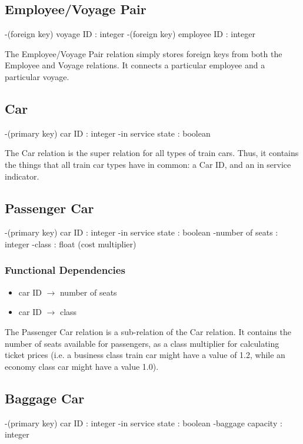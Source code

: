\documentclass[a4paper]{article}
\begin{document}
\subsection*{Employee/Voyage Pair}
\begin{itemize}
-(foreign key) voyage ID : integer
-(foreign key) employee ID : integer
\end{itemize}
The Employee/Voyage Pair relation simply stores foreign keys from both the Employee and Voyage relations. It connects a particular employee and a particular voyage.

\subsection*{Car}
\begin{itemize}
-(primary key) car ID : integer
-in service state : boolean
\end{itemize}
The Car relation is the super relation for all types of train cars. Thus, it contains the things that all train car types have in common: a Car ID, and an in service indicator.

\subsection*{Passenger Car}
\begin{itemize}
-(primary key) car ID : integer
-in service state : boolean
-number of seats : integer
-class : float (cost multiplier)
\end{itemize}
\subsubsection*{Functional Dependencies}
\begin{itemize}
\item car ID $\rightarrow$ number of seats
\item car ID $\rightarrow$ class
\end{itemize}
The Passenger Car relation is a sub-relation of the Car relation. It contains the number of seats available for passengers, as a class multiplier for calculating ticket prices (i.e. a business class train car might have a value of 1.2, while an economy class car might have a value 1.0).

\subsection*{Baggage Car}
\begin{itemize}
-(primary key) car ID : integer
-in service state : boolean
-baggage capacity  : integer
\end{itemize}
\end{document}

